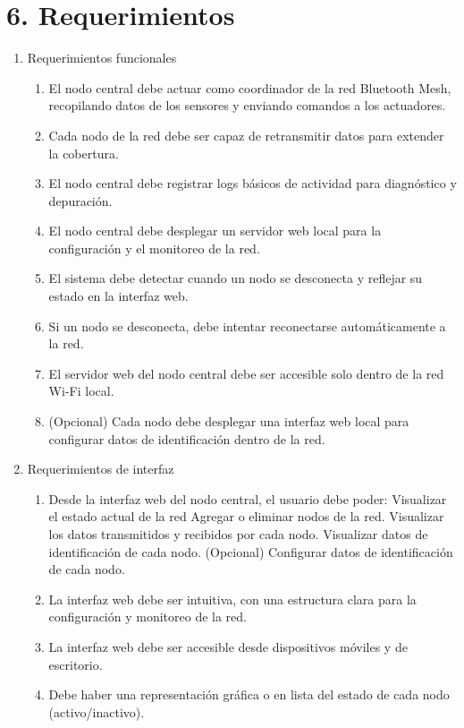 \documentclass[
11pt, %
]{charter}
\begin{document}
\section{6. Requerimientos}
\label{sec:requerimientos}

\begin{enumerate}
\item Requerimientos funcionales
	\begin{enumerate}
		\item El nodo central debe actuar como coordinador de la red Bluetooth Mesh, recopilando datos de los sensores y enviando comandos a los actuadores.
		\item Cada nodo de la red debe ser capaz de retransmitir datos para extender la cobertura.
		\item El nodo central debe registrar logs básicos de actividad para diagnóstico y depuración.
		\item El nodo central debe desplegar un servidor web local para la configuración y el monitoreo de la red.
		\item El sistema debe detectar cuando un nodo se desconecta y reflejar su estado en la interfaz web.
		\item Si un nodo se desconecta, debe intentar reconectarse automáticamente a la red.
		\item El servidor web del nodo central debe ser accesible solo dentro de la red Wi-Fi local.
		\item (Opcional) Cada nodo debe desplegar una interfaz web local para configurar datos de identificación dentro de la red. 
	\end{enumerate}

\item Requerimientos de interfaz
	\begin{enumerate}
		\item Desde la interfaz web del nodo central, el usuario debe poder:
		\subitem Visualizar el estado actual de la red
		\subitem Agregar o eliminar nodos de la red.
		\subitem Visualizar los datos transmitidos y recibidos por cada nodo.
		\subitem Visualizar datos de identificación de cada nodo.
		\subitem (Opcional) Configurar datos de identificación de cada nodo.
		\item La interfaz web debe ser intuitiva, con una estructura clara para la configuración y monitoreo de la red.
		\item La interfaz web debe ser accesible desde dispositivos móviles y de escritorio.
		\item Debe haber una representación gráfica o en lista del estado de cada nodo (activo/inactivo).


\end{enumerate}
\end{enumerate}
\end{document}
